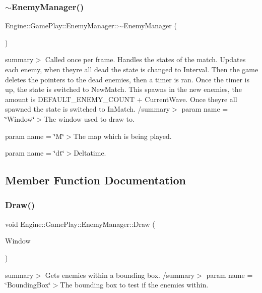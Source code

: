 \subsubsection{\texorpdfstring{$\sim$\+Enemy\+Manager()}{~EnemyManager()}}
{\footnotesize\ttfamily Engine\+::\+Game\+Play\+::\+Enemy\+Manager\+::$\sim$\+Enemy\+Manager (\begin{DoxyParamCaption}{ }\end{DoxyParamCaption})}

summary$>$ Called once per frame. Handles the states of the match. Updates each enemy, when they\textquotesingle{}re all dead the state is changed to Interval. Then the game deletes the pointers to the dead enemies, then a timer is ran. Once the timer is up, the state is switched to New\+Match. This spawns in the new enemies, the amount is D\+E\+F\+A\+U\+L\+T\+\_\+\+E\+N\+E\+M\+Y\+\_\+\+C\+O\+U\+NT + Current\+Wave. Once they\textquotesingle{}re all spawned the state is switched to In\+Match. /summary$>$ param name = \char`\"{}\+Window\char`\"{}$>$The window used to draw to.

param name = \char`\"{}\+M\char`\"{}$>$The map which is being played.

param name = \char`\"{}dt\char`\"{}$>$Deltatime.

\subsection{Member Function Documentation}
\mbox{\label{class_engine_1_1_game_play_1_1_enemy_manager_a8feb401224cac44bec8b2d2c00b0910c}} 
\subsubsection{\texorpdfstring{Draw()}{Draw()}}
{\footnotesize\ttfamily void Engine\+::\+Game\+Play\+::\+Enemy\+Manager\+::\+Draw (\begin{DoxyParamCaption}\item[{Render\+Window $\ast$}]{Window }\end{DoxyParamCaption})}

summary$>$ Gets enemies within a bounding box. /summary$>$ param name = \char`\"{}\+Bounding\+Box\char`\"{}$>$The bounding box to test if the enemies within.

